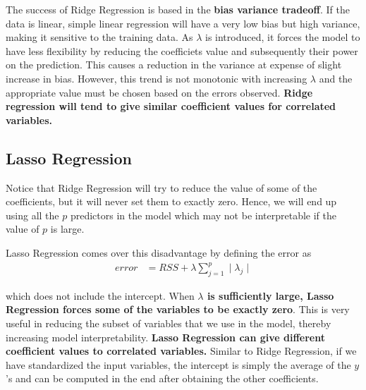 \documentclass[../statistical_learning_notes.tex]{subfiles}
\begin{document}
    The success of Ridge Regression is based in the \textbf{bias variance tradeoff}. If the data is linear, simple linear regression will have a very low bias but high variance, making it sensitive to the training data. As $\lambda$ is introduced, it forces the model to have less flexibility by reducing the coefficiets value and subsequently their power on the prediction. This causes a reduction in the variance at expense of slight increase in bias. However, this trend is not monotonic with increasing $\lambda$ and the appropriate value must be chosen based on the errors observed.\newline
    \textbf{Ridge regression will tend to give similar coefficient values for correlated variables.} 

    
    \subsection{Lasso Regression}
    Notice that Ridge Regression will try to reduce the value of some of the coefficients, but it will never set them to exactly zero. Hence, we will end up using all the $p$ predictors in the model which may not be interpretable if the value of $p$ is large.\newline

    Lasso Regression comes over this disadvantage by defining the error as
    \begin{align*}
        error &= RSS + \lambda \sum_{j=1}^{p}\mid \lambda_{j} \mid
    \end{align*}

    which does not include the intercept. When \textbf{$\lambda$ is sufficiently large, Lasso Regression forces some of the variables to be exactly zero}. This is very useful in reducing the subset of variables that we use in the model, thereby increasing model interpretability.\newline
    \textbf{Lasso Regression can give different coefficient values to correlated variables.}\newline
    Similar to Ridge Regression, if we have standardized the input variables, the intercept is simply the average of the $y$'s and can be computed in the end after obtaining the other coefficients.


\end{document}
